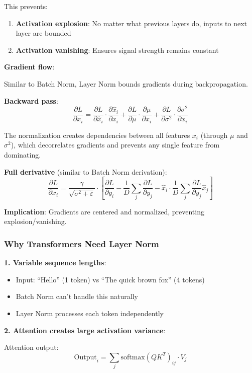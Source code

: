 \documentclass[11pt,oneside]{book}
\begin{document}
This prevents:
\begin{enumerate}
\item \textbf{Activation explosion}: No matter what previous layers do, inputs to next layer are bounded
\item \textbf{Activation vanishing}: Ensures signal strength remains constant
\end{enumerate}

\textbf{Gradient flow}:

Similar to Batch Norm, Layer Norm bounds gradients during backpropagation.

\textbf{Backward pass}:
\[
\frac{\partial L}{\partial x_i} = \frac{\partial L}{\partial \hat{x}_i} \cdot \frac{\partial \hat{x}_i}{\partial x_i} + \frac{\partial L}{\partial \mu} \cdot \frac{\partial \mu}{\partial x_i} + \frac{\partial L}{\partial \sigma^2} \cdot \frac{\partial \sigma^2}{\partial x_i}
\]

The normalization creates dependencies between all features $x_i$ (through $\mu$ and $\sigma^2$), which decorrelates gradients and prevents any single feature from dominating.

\textbf{Full derivative} (similar to Batch Norm derivation):
\[
\frac{\partial L}{\partial x_i} = \frac{\gamma}{\sqrt{\sigma^2 + \varepsilon}} \cdot \left[\frac{\partial L}{\partial y_i} - \frac{1}{D}\sum_j\frac{\partial L}{\partial y_j} - \hat{x}_i \cdot \frac{1}{D}\sum_j\frac{\partial L}{\partial y_j}\hat{x}_j\right]
\]

\textbf{Implication}: Gradients are centered and normalized, preventing explosion/vanishing.

\subsubsection{Why Transformers Need Layer Norm}

\textbf{1. Variable sequence lengths}:
\begin{itemize}
\item Input: ``Hello'' (1 token) vs ``The quick brown fox'' (4 tokens)
\item Batch Norm can't handle this naturally
\item Layer Norm processes each token independently
\end{itemize}

\textbf{2. Attention creates large activation variance}:

Attention output:
\[
\text{Output}_i = \sum_j \text{softmax}(QK^T)_{ij} \cdot V_j
\]
\end{document}
